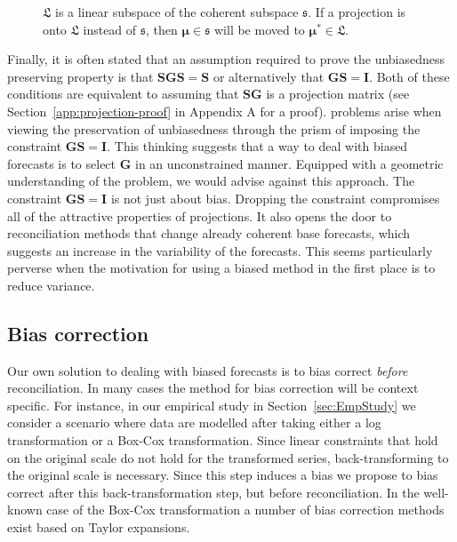 \documentclass[12pt]{article}
\theoremstyle{definition}
\begin{document}
\begin{figure}[!hbt]
  \centering
  \vspace{-0.9cm}
  \small
  \resizebox{0.8\linewidth}{!}{
    
  }
  \caption{$\mathfrak{L}$ is a linear subspace of the coherent subspace $\mathfrak{s}$. If a projection is onto $\mathfrak{L}$ instead of $\mathfrak{s}$, then $\bm{\mu} \in \mathfrak{s}$ will be moved to $\bm{\mu}^* \in \mathfrak{L}$.}\label{fig:Schematic_3D}
\end{figure}

Finally, it is often stated that an assumption required to prove the unbiasedness preserving property is that $\bm{S}\bm{G}\bm{S}=\bm{S}$ or alternatively that $\bm{G}\bm{S}=\bm{I}$. Both of these conditions are equivalent to assuming that $\bm{S}\bm{G}$ is a projection matrix (see Section~\ref{app:projection-proof} in Appendix A for a proof). {\color{blue}{Despite this connection,}} problems arise when viewing the preservation of unbiasedness through the prism of imposing the constraint $\bm{G}\bm{S}=\bm{I}$. This thinking suggests that a way to deal with biased forecasts is to select $\bm{G}$ in an unconstrained manner. Equipped with a geometric understanding of the problem, we would advise against this approach. The constraint $\bm{G}\bm{S}=\bm{I}$ is not just about bias. Dropping the constraint compromises all of the attractive properties of projections. It also opens the door to reconciliation methods that change already coherent base forecasts, which suggests an increase in the variability of the forecasts. This seems particularly perverse when the motivation for using a biased method in the first place is to reduce variance.

\subsection{Bias correction}

Our own solution to dealing with biased forecasts is to bias correct \emph{before} reconciliation. In many cases the method for bias correction will be context specific. For instance, in our empirical study in Section~\ref{sec:EmpStudy} we consider a scenario where {\color{blue} data are modelled after} taking either a log transformation or a Box-Cox transformation. {\color{blue} Since linear constraints that hold on the original scale do not hold for the transformed series, back-transforming to the original scale is necessary.  Since this step induces a bias we propose to bias correct after this back-transformation step, but before reconciliation.}  In the well-known case {\color{blue} of the Box-Cox transformation} a number of bias correction methods exist based on Taylor expansions.
\end{document}
